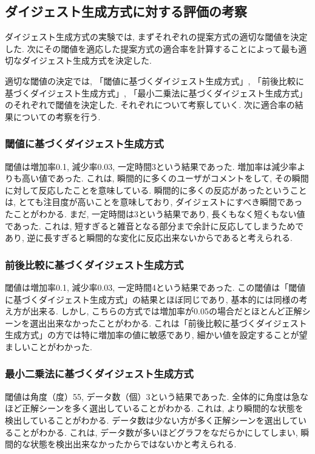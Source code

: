 \subsection{ダイジェスト生成方式に対する評価の考察}
ダイジェスト生成方式の実験では, まずそれぞれの提案方式の適切な閾値を決定した. 次にその閾値を適応した提案方式の適合率を計算することによって最も適切なダイジェスト生成方式を決定した.

適切な閾値の決定では, 「閾値に基づくダイジェスト生成方式」, 「前後比較に基づくダイジェスト生成方式」, 「最小二乗法に基づくダイジェスト生成方式」のそれぞれで閾値を決定した. それぞれについて考察していく. 次に適合率の結果についての考察を行う.

\subsubsection{閾値に基づくダイジェスト生成方式}
閾値は増加率0.1, 減少率0.03, 一定時間3という結果であった. 増加率は減少率よりも高い値であった. これは, 瞬間的に多くのユーザがコメントをして, その瞬間に対して反応したことを意味している. 瞬間的に多くの反応があったということは, とても注目度が高いことを意味しており, ダイジェストにすべき瞬間であったことがわかる. まだ, 一定時間は3という結果であり, 長くもなく短くもない値であった. これは, 短すぎると雑音となる部分まで余計に反応してしまうためであり, 逆に長すぎると瞬間的な変化に反応出来ないからであると考えられる.

\subsubsection{前後比較に基づくダイジェスト生成方式}
閾値は増加率0.1, 減少率0.03, 一定時間4という結果であった. この閾値は「閾値に基づくダイジェスト生成方式」の結果とほぼ同じであり, 基本的には同様の考え方が出来る. しかし, こちらの方式では増加率が0.05の場合だとほとんど正解シーンを選出出来なかったことがわかる. これは「前後比較に基づくダイジェスト生成方式」の方では特に増加率の値に敏感であり, 細かい値を設定することが望ましいことがわかった.

\subsubsection{最小二乗法に基づくダイジェスト生成方式}
閾値は角度（度）55, データ数（個）3という結果であった. 全体的に角度は急なほど正解シーンを多く選出していることがわかる. これは, より瞬間的な状態を検出していることがわかる. データ数は少ない方が多く正解シーンを選出していることがわかる. これは, データ数が多いほどグラフをなだらかにしてしまい, 瞬間的な状態を検出出来なかったからではないかと考えられる.

